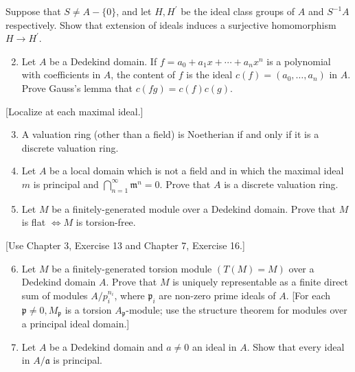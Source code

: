 \documentclass{standalone}
\theoremstyle{definition}
\theoremstyle{remark}
\begin{document}
Suppose that $S \neq A-\{0\}$, and let $H, H^{\prime}$ be the ideal class groups of $A$ and $S^{-1} A$ respectively. Show that extension of ideals induces a surjective homomorphism $H \rightarrow H^{\prime}$.

\begin{enumerate}
  \setcounter{enumi}{1}
  \item Let $A$ be a Dedekind domain. If $f=a_{0}+a_{1} x+\cdots+a_{n} x^{n}$ is a polynomial with coefficients in $A$, the content of $f$ is the ideal $c(f)=\left(a_{0}, \ldots, a_{n}\right)$ in $A$. Prove Gauss's lemma that $c(f g)=c(f) c(g)$.
\end{enumerate}

[Localize at each maximal ideal.]

\begin{enumerate}
  \setcounter{enumi}{2}
  \item A valuation ring (other than a field) is Noetherian if and only if it is a discrete valuation ring.

  \item Let $A$ be a local domain which is not a field and in which the maximal ideal $m$ is principal and $\bigcap_{n=1}^{\infty} \mathfrak{m}^{n}=0$. Prove that $A$ is a discrete valuation ring.

  \item Let $M$ be a finitely-generated module over a Dedekind domain. Prove that $M$ is flat $\Leftrightarrow M$ is torsion-free.

\end{enumerate}

[Use Chapter 3, Exercise 13 and Chapter 7, Exercise 16.]

\begin{enumerate}
  \setcounter{enumi}{5}
  \item Let $M$ be a finitely-generated torsion module $(T(M)=M)$ over a Dedekind domain $A$. Prove that $M$ is uniquely representable as a finite direct sum of modules $A / p_{i}^{n_{i}}$, where $\mathfrak{p}_{i}$ are non-zero prime ideals of $A$. [For each $\mathfrak{p} \neq 0, M_{\mathfrak{p}}$ is a torsion $A_{\mathfrak{p}}$-module; use the structure theorem for modules over a principal ideal domain.]

  \item Let $A$ be a Dedekind domain and $a \neq 0$ an ideal in $A$. Show that every ideal in $A / \mathfrak{a}$ is principal.

\end{enumerate}
\end{document}
